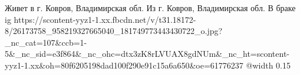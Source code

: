  
 
 
 
 

\par
Живет в г. Ковров, Владимирская обл.
Из г. Ковров, Владимирская обл.
В браке
\ifcmt
  ig https://scontent-yyz1-1.xx.fbcdn.net/v/t31.18172-8/26173758_958219327665040_181749773443430722_o.jpg?_nc_cat=107&ccb=1-5&_nc_sid=e3f864&_nc_ohc=dtx3zK8rLVUAX8gdNUm&_nc_ht=scontent-yyz1-1.xx&oh=80f6205198dad100f290e91c15a6a650&oe=61776237
  @width 0.15
\fi

